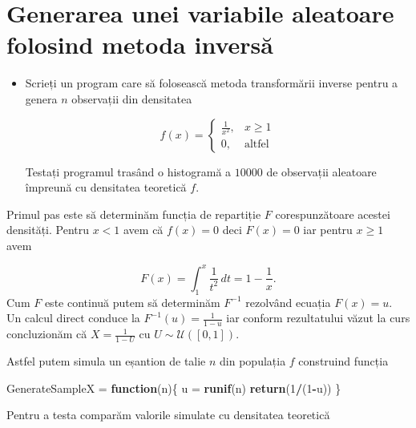\documentclass[]{article}
\newenvironment{Shaded}{\begin{snugshade}}{\end{snugshade}}
\newcommand{\KeywordTok}[1]{\textcolor[rgb]{0.13,0.29,0.53}{\textbf{#1}}}
\newcommand{\DecValTok}[1]{\textcolor[rgb]{0.00,0.00,0.81}{#1}}
\newcommand{\StringTok}[1]{\textcolor[rgb]{0.31,0.60,0.02}{#1}}
\newcommand{\ControlFlowTok}[1]{\textcolor[rgb]{0.13,0.29,0.53}{\textbf{#1}}}
\newcommand{\OperatorTok}[1]{\textcolor[rgb]{0.81,0.36,0.00}{\textbf{#1}}}
\newcommand{\NormalTok}[1]{#1}
\newenvironment{frshaded*}{%
  \def\FrameCommand{\fboxrule=\FrameRule\fboxsep=\FrameSep \fcolorbox{framecolor}{shadecolor1}}%
  \MakeFramed {\advance\hsize-\width \FrameRestore}}%
{\endMakeFramed}
\newenvironment{rmdblock}[1]
  {\begin{frshaded*}
  \begin{itemize}
  \renewcommand{\labelitemi}{
    \raisebox{-.7\height}[0pt][0pt]{
      {\setkeys{Gin}{width=2em,keepaspectratio}\texttt{[image: images/icons/\#1]}}
    }
  }
  \item
  }
  {
  \end{itemize}
  \end{frshaded*}
  }
\newenvironment{rmdexercise}
  {\begin{rmdblock}{exercise}}
  {\end{rmdblock}}
\begin{document}
\section{Generarea unei variabile aleatoare folosind metoda
inversă}\label{generarea-unei-variabile-aleatoare-folosind-metoda-inversa}

\begin{rmdexercise}
Scrieți un program care să folosească metoda transformării inverse
pentru a genera \(n\) observații din densitatea

\[
  f(x) = \left\{\begin{array}{ll}
        \frac{1}{x^2}, & x\geq 1\\
        0, & \text{altfel}
  \end{array}\right.
\]

Testați programul trasând o histogramă a \(10000\) de observații
aleatoare împreună cu densitatea teoretică \(f\).
\end{rmdexercise}

Primul pas este să determinăm funcția de repartiție \(F\)
corespunzătoare acestei densități. Pentru \(x<1\) avem că \(f(x)=0\)
deci \(F(x)=0\) iar pentru \(x\geq 1\) avem

\[
  F(x) = \int_{1}^{x}\frac{1}{t^2}\, dt = 1 - \frac{1}{x}.
\] Cum \(F\) este continuă putem să determinăm \(F^{-1}\) rezolvând
ecuația \(F(x)=u\). Un calcul direct conduce la
\(F^{-1}(u)=\frac{1}{1-u}\) iar conform rezultatului văzut la curs
concluzionăm că \(X = \frac{1}{1-U}\) cu \(U\sim \mathcal{U}([0,1])\).

Astfel putem simula un eșantion de talie \(n\) din populația \(f\)
construind funcția

\begin{Shaded}
\begin{Highlighting}[]
\NormalTok{GenerateSampleX =}\StringTok{ }\ControlFlowTok{function}\NormalTok{(n)\{}
\NormalTok{  u =}\StringTok{ }\KeywordTok{runif}\NormalTok{(n)}
  \KeywordTok{return}\NormalTok{(}\DecValTok{1}\OperatorTok{/}\NormalTok{(}\DecValTok{1}\OperatorTok{-}\NormalTok{u))}
\NormalTok{\}}
\end{Highlighting}
\end{Shaded}

Pentru a testa comparăm valorile simulate cu densitatea teoretică
\end{document}
